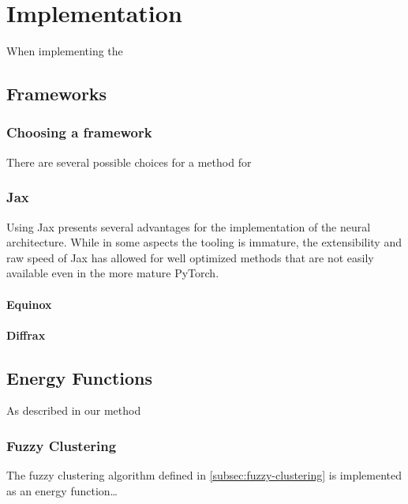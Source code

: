 \documentclass[../main.tex]{subfiles}
\begin{document}
    \chapter{Implementation}\label{ch:implementation}
    When implementing the



    \section{Frameworks}\label{sec:frameworks}

    \subsection{Choosing a framework}\label{subsec:choosing-a-framework}
    There are several possible choices for a method for

    \subsection{Jax}\label{subsec:jax}
    Using Jax presents several advantages for the implementation of the neural architecture.
    While in some aspects the tooling is immature, the extensibility and raw speed of Jax has allowed for well optimized methods that are not easily available even in the more mature PyTorch.

    \subsubsection{Equinox}\label{subsubsec:equinox}

    \subsubsection{Diffrax}\label{subsubsec:diffrax}

    \section{Energy Functions}\label{sec:energy-functions}
    As described in our method

    \subsection{Fuzzy Clustering}\label{subsec:implementing-fuzzy-clustering}
    The fuzzy clustering algorithm defined in \autoref{subsec:fuzzy-clustering} is implemented as an energy function\ldots
\end{document}
